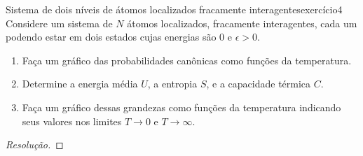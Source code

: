 \begin{exercício}{Sistema de dois níveis de átomos localizados fracamente interagentes}{exercício4}
    Considere um sistema de \(N\) átomos localizados, fracamente interagentes, cada um podendo estar em dois estados cujas energias são \(0\) e \(\epsilon > 0\).
    \begin{enumerate}[label=(\alph*)]
        \item Faça um gráfico das probabilidades canônicas como funções da temperatura.
        \item Determine a energia média \(U\), a entropia \(S\), e a capacidade térmica \(C\).
        \item Faça um gráfico dessas grandezas como funções da temperatura indicando seus valores nos limites \(T \to 0\) e \(T \to \infty\).
    \end{enumerate}
\end{exercício}
\begin{proof}[Resolução]

\end{proof}
